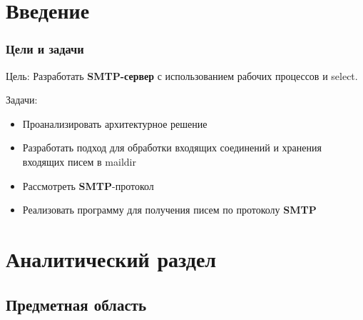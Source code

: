 \documentclass[a4paper,12pt]{report}
\begin{document}
\tableofcontents
\setcounter{page}{3} %
\chapter*{Введение}
\subsection{Цели и задачи}

Цель: 
    Разработать \textbf{SMTP-сервер} с использованием рабочих процессов и select.

Задачи:
\begin{itemize}
    \item Проанализировать архитектурное решение
    \item Разработать подход для обработки входящих соединений и хранения входящих писем в maildir
    \item Рассмотреть \textbf{SMTP}-протокол
    \item Реализовать программу для получения писем по протоколу \textbf{SMTP}
\end{itemize}

\chapter{Аналитический раздел}

\section*{Предметная область}
\end{document}
